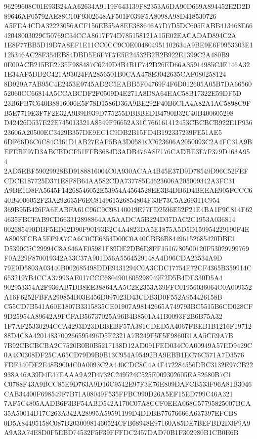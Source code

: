 \documentclass[UTF8,fontset=fandol,zihao=-4,a4paper]{ctexart}
\begin{document}
{{96299608C01E93B24AA62634A9119F643139F82353A6DA90D669A894452E2D2D89646AF05792AE88C10F9302648AF501F039F5A8098A98D418530726
A5FEA4CDA32223056ACF156EB55A8EE388646A7D7D5DC605EABB413468E6642048003029C50769C34CCA8617F74D785158121A15E02EACADAD894C2A
1E8F77BB5D19D7A8EF1E11CC0CC9C0E004804951102634A9BE9E6F9953303E1125346AC28F354EB84DBD5E6F7E7E5E24532B2B2B922E1399C2A480B9
0E00ACB215BE2735F988487C6249D4B4B1F742D26ED66A35914985C3E146A321E34AF5DD2C421A93024FA2856501B0CAA478E3042635CAF080258124
8D929A7AB95C4E2453E9745AD2C5EABB5F04769F4F6D012605A05B7DA6656052060CC66814A5CCABCDF2F0509D4E271A8D8A64EAC58B17322E59DF5D
23B6FB7C640B8816006E5F78D1586D36A9BE292F40B6C1A4A82A1AC5898C9FB5E7719E3F7F2E32A9B9B939D775255DBBBEDB4790B32C40B400605298
D42426D537E22E745013321A8549F96652A31C766161412453CBCBCB922E1F93623606A20500EC3429B357DE9EC1C9DB2B15FD4B192337239FE51AE5
6DF66D6C6C84C361D1AB27EAF5BA3D0581CC623606A2050093C2A4FC31A9BEFEBF97D3ABCBDCF51FFB3684D3ADB476A8F176CADBE3E7F379D163A954
2AD5EBF59029928BD9188816004C0A930ACAA4B45E37D9D78549D96C52FEFCDCE187725D371E8F8B64AA582CDA737785E4623606A205009342A3FC31
A9BE1D8FA5645F14268546052E53954A4564528EE3B4DB6D4BEEAE905FCCC640B4006052F23A292635F6EC814961526854804F33F73C5A269311C954
369B95B426FA6EABFA61C96C0C98140019E77FD2596E52F21E4BA1F9C814F624635FBCFAB9CD663312898864AA5AADCA5B224D37DAC2C1953A036814
002685490DBF5ED62D90F90193B2C4A4823DA5E1875A5D5D159954229190F4EA8903FCBA5EF9A7CA6C0CE6354D00C0A40CBB6B84496152685420DBE1
D5390C5C29994C8A646AE05981F89DE2DB6D8FF1516780500120F53029799769F0A229F870019342A33C37A901D56A5564529148A4D96CDA23534A9D
79E0D5803A03440B002685498DDE9431294C0A3CDC17754E72CF4365B359914C6532197B4CCA37993AE017CCC6804901605298949F2D5B4DE330D5A4
902953354A2F936AB7DB8EE38864AA5C2E2353A39FFC01956036064C0A009352A16F6252FBFA299854B03E456D097023D43CDB3D0F552A954426158B
C55CD7B541A60E1807B3315835CE01907A98142665A749793BC5515B6CD028CF9D25954A89642A9FCFAB56737025A96B4B8501A41B0093F2B6B75A32
1F7AF25330294CCA4293D23DBBEBF57A381CDED5A4067FBEB1B1216F1971288D4C8A4201483700266595496D5F2321A7B249F5F5F9860E1AA5CE9A7B
7B92CBCBCBA2C7520B0B0B5217138D12AD091FED034C0A00949A57ED9429C0A4C0308DF25CA65CD79D9B9B13C954A95492BA9EBB1EC76C571A7D3576
FDF340DE2E48B9004C0A0093C2A440CDC8C4A4F472284556DBC3132E97CB22938A46A39D4E47EAAA9A2D4732C249524C525E009302605EA52680B7C1
C0788F43A9BCC85E9D763A9D16C9542E97F3E76E809DAFCB533F96A81B3046CAB34400F698549F7B71A08049F535FFBC990D26A5EF15ED799C46A321
7AF5C4805AADB6F3BF54ABD542A170C07A8CCF0EEA068C57795825007BCA35A50014D17C263A342A28995A59591199D4DDBB77676666A637397EFCB8
0D5A84495158C087B20300981460524CFB68948E97160A85DE7BEFBD2D3F9A9A9A3A74E8D0F5EBD74532F5F39FFFDC2457DAD70B1F302980B1CB0E6B
}}
\end{document}
